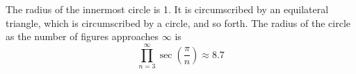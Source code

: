 \documentclass{article}
\begin{document}
\begin{center}
	
\end{center}

The radius of the innermost circle is 1.  It is circumscribed by an 
equilateral triangle, which is circumscribed by a circle, and so forth.  
The radius of the circle as the number of figures approaches $\infty$ is 
\[
  \prod_{n=3}^\infty \sec\left(\frac{\pi}{n}\right) \approx 8.7
\]
\end{document}
